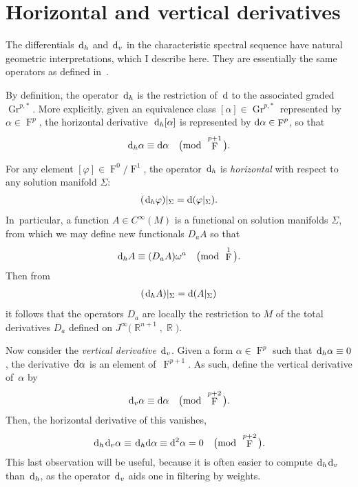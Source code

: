 \documentclass[10pt,a4paper]{amsart}
\DeclareMathOperator{\R}{\mathbb{R}}
\DeclareMathOperator{\Gr}{Gr}
\renewcommand{\d}{{\rm d}}
\renewcommand{\mod}[1]{\quad\big(\mathrm{mod\enspace} #1\big)}
\DeclareMathOperator{\pwf}{F}
\renewcommand{\dh}{\ensuremath{\hspace{1pt} \d_h}}
\newcommand{\dv}{\ensuremath{\hspace{1pt} \d_v}}
\newcommand{\cMinfty}{C^\infty(M)}
\numberwithin{equation}{section}
\begin{document}
\section{Horizontal and vertical derivatives}\label{sec:dv and dh}

The differentials $\dh$ and $\dv$ in the characteristic spectral sequence have natural geometric interpretations, which I describe here. They are essentially the same operators as defined in~\cite{Characteristic_Cohomology_I}.

By definition, the operator $\dh$ is the restriction of~$\d$ to the associated graded $\Gr^{p,*}$. More expli\-ci\-tly, given an equivalence class $[\alpha] \in \Gr^{p,*}$ represented by $\alpha \in \pwf^p$, the horizontal derivative~$\dh[\alpha]$ is represented by $\d\alpha \in \pwf^p$, so that
\begin{gather*}
\dh\alpha \equiv \d\alpha \mod{\pwf^{p+1}} .
\end{gather*}

For any element $[\varphi] \in \pwf^0/\pwf^1$, the operator $\dh$ is \emph{horizontal} with respect to any solution manifold $\Sigma$:
\begin{gather*}
(\dh \varphi)|_\Sigma = \d(\varphi|_\Sigma) .
\end{gather*}
In~particular, a function $A \in \cMinfty$ is a functional on solution manifolds $\Sigma$, from which we may define new functionals $D_a A$ so that
\begin{gather*}
\dh A \equiv (D_a A) \omega^a \mod{\pwf^1} .
\end{gather*}
Then from
\begin{gather*}
(\dh A)|_\Sigma = \d(A|_\Sigma)
\end{gather*}
it follows that the operators $D_a$ are locally the restriction to $M$ of the total derivatives $D_a$ defined on $J^\infty\big(\R^{n+1},\R\big)$.

Now consider the \emph{vertical derivative} $\dv$. Given a form $\alpha \in \pwf^{p}$ such that $\dh\alpha \equiv 0$, the deriva\-tive~$\d\alpha$ is an element of~$\pwf^{p+1}$. As such, define the vertical derivative of~$\alpha$ by
\begin{gather*}
\dv\alpha \equiv \d\alpha \mod{\pwf^{p+2}} .
\end{gather*}
Then, the horizontal derivative of this vanishes,
\begin{gather*}
\dh\dv\alpha \equiv \dh\d\alpha \equiv \d^2\alpha = 0 \mod{\pwf^{p+2}} .
\end{gather*}
This last observation will be useful, because it is often easier to compute $\dh\dv$ than $\dh$, as the operator $\dv$ aids one in filtering by weights.
\end{document}

